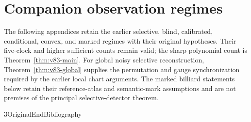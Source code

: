 




\appendix
\section*{Companion observation regimes}
The following appendices retain the earlier selective, blind, calibrated,
conditional, convex, and marked regimes with their original hypotheses.
Their five-clock and higher sufficient counts remain valid; the sharp
polynomial count is Theorem~\ref{thm:v83-main}. For global noisy
selective reconstruction, Theorem~\ref{thm:v83-global} supplies the
permutation and gauge synchronization required by the earlier local
chart arguments. The marked billiard statements below retain their
reference-atlas and semantic-mark assumptions and are not premises of
the principal selective-detector theorem.
















\let\VPreviousSection\section
\def\section#1{\let\section\VPreviousSection
\section{Convex twist suspensions: six conditional laws and four raw laws}}







\let\V83OriginalEndBibliography\endthebibliography
\def\endthebibliography{\V83OriginalEndBibliography}


